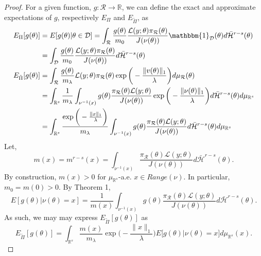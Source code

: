 \documentclass[10pt,fleqn]{article} \pdfoutput=1
\DeclareMathOperator{\1}{\mathbbm{1}} \DeclareMathOperator{\bigO}{\mc O}
\begin{document}
\begin{proof}
	For a given function, $g:\mathcal{R}\to\mathbb{R}$, we can define the exact
	and approximate expectations of $g$, respectively $E_\Pi$ and
	$E_{\tilde{\Pi}}$, as \begin{align*} E_\Pi[g(\theta)]           & =
		E[g(\theta)|\theta\in\mathcal{D}] = \int_\mathcal{R}
		\frac{g(\theta)}{m_0}
		\frac{\mathcal{L}(y;\theta)\pi_\mathcal{R}(\theta)}{J(\nu(\theta))}\mathbbm{1}_\mathcal{D}(\theta)d\bar{\mathcal{H}}^{r-s}(\theta)
		\\ &=\int_\mathcal{D} \frac{g(\theta)}{m_0}
		\frac{\mathcal{L}(y;\theta)\pi_\mathcal{R}(\theta)}{J(\nu(\theta))}d\bar{\mathcal{H}}^{r-s}(\theta) \\
		E_{\tilde{\Pi}}[g(\theta)] & = \int_\mathcal{R}
		\frac{g(\theta)}{m_\lambda}
		\mathcal{L}(y;\theta)\pi_\mathcal{R}(\theta)\exp\bigg(-\frac{\|v(\theta)\|_1}{\lambda}\bigg)d\mu_\mathcal{R}(\theta)
		\\ &= \int_{\mathbb{R}^s} \frac{1}{m_\lambda} \int_{\nu^{-1}(x)}
		g(\theta)
		\frac{\pi_\mathcal{R}(\theta)\mathcal{L}(y;\theta)}{J(\nu(\theta))}
		\exp\bigg(-\frac{\|\nu(\theta)\|_1}{\lambda}\bigg)
		d\bar{\mathcal{H}}^{r-s}(\theta) d\mu_{\mathbb{R}^s}                                                \\
		                           & =\int_{\mathbb{R}^s}
		\frac{\exp\bigg(-\frac{\|x\|_1}{\lambda}\bigg) }{m_\lambda}
		\int_{\nu^{-1}(x)} g(\theta)
		\frac{\pi_\mathcal{R}(\theta)\mathcal{L}(y;\theta)}{J(\nu(\theta))}
		d\bar{\mathcal{H}}^{r-s}(\theta) d\mu_{\mathbb{R}^s}\end{align*}
	Let, $$m(x) = m^{r-s}(x) =
		\int_{\nu^{-1}(x)}\frac{\pi_\mathcal{R}(\theta)\mathcal{L}(y;\theta)}{J(\nu(\theta))}
		d\bar{\mathcal{H}}^{r-s}(\theta) .$$ By construction, $m(x) > 0$
	for $\mu_{\mathbb{R}^s}$-a.e. $x\in Range(\nu)$. In particular,
	$m_0=m(0)>0$. By Theorem 1, \begin{equation} E[g(\theta) |
		\nu(\theta) = x] = \frac{1}{m(x)} \int_{\nu^{-1}(x)}
		g(\theta)\frac{\pi_\mathcal{R}(\theta)\mathcal{L}(y;\theta)}{J(\nu(\theta))}
		d\bar{\mathcal{H}}^{r-s}(\theta).  \end{equation} As such, we may may
	express $E_{\tilde{\Pi}}[g(\theta)]$ as \begin{equation}
		E_{\tilde{\Pi}}[g(\theta)] = \int_{\mathbb{R}^s}
		\frac{m(x)}{m_\lambda}\exp\bigg(-\frac{\|x\|_1}{\lambda}\bigg)
		E\big[g(\theta)|\nu(\theta)=x\big] d\mu_{\mathbb{R}^s}(x).
	\end{equation}


\end{proof}
\end{document}
